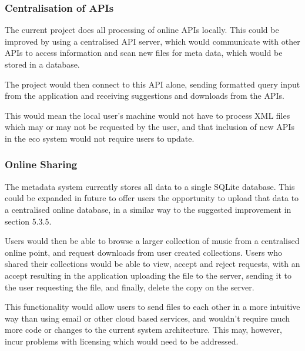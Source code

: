 \subsubsection{Centralisation of APIs}
The current project does all processing of online APIs locally. This could be improved by using a centralised API server, which would communicate with other APIs to access information and scan new files for meta data, which would be stored in a database.

The project would then connect to this API alone, sending formatted query input from the application and receiving suggestions and downloads from the APIs.

This would mean the local user's machine would not have to process XML files which may or may not be requested by the user, and that inclusion of new APIs in the eco system would not require users to update. 

\subsubsection{Online Sharing}
The metadata system currently stores all data to a single SQLite database. This could be expanded in future to offer users the opportunity to upload that data to a centralised online database, in a similar way to the suggested improvement in section 5.3.5.

Users would then be able to browse a larger collection of music from a centralised online point, and request downloads from user created collections. Users who shared their collections would be able to view, accept and reject requests, with an accept resulting in the application uploading the file to the server, sending it to the user requesting the file, and finally, delete the copy on the server.

This functionality would allow users to send files to each other in a more intuitive way than using email or other cloud based services, and wouldn't require much more code or changes to the current system architecture. This may, however, incur problems with licensing which would need to be addressed.
